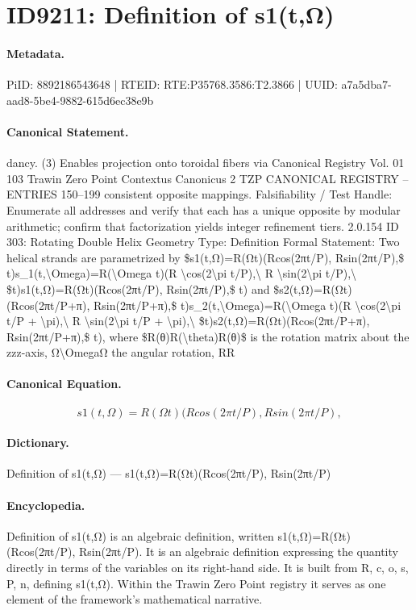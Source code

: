 \section*{ID9211: Definition of s1(t,Ω)}
\paragraph{Metadata.}
PiID: 8892186543648 | RTEID: RTE:P35768.3586:T2.3866 | UUID: a7a5dba7-aad8-5be4-9882-615d6ec38e9b

\paragraph{Canonical Statement.}
dancy. (3) Enables projection onto toroidal fibers via Canonical Registry Vol. 01 103 Trawin Zero Point Contextus Canonicus 2 TZP CANONICAL REGISTRY – ENTRIES 150–199 consistent opposite mappings. Falsifiability / Test Handle: Enumerate all addresses and verify that each has a unique opposite by modular arithmetic; confirm that factorization yields integer refinement tiers. 2.0.154 ID 303: Rotating Double Helix Geometry Type: Definition Formal Statement: Two helical strands are parametrized by \$s1(t,Ω)=R(Ωt)(Rcos(2πt/P), Rsin(2πt/P),\$ t)s\_1(t,\textbackslash{}Omega)=R(\textbackslash{}Omega t)(R \textbackslash{}cos(2\textbackslash{}pi t/P),\textbackslash{} R \textbackslash{}sin(2\textbackslash{}pi t/P),\textbackslash{} \$t)s1(t,Ω)=R(Ωt)(Rcos(2πt/P), Rsin(2πt/P),\$ t) and \$s2(t,Ω)=R(Ωt)(Rcos(2πt/P+π), Rsin(2πt/P+π),\$ t)s\_2(t,\textbackslash{}Omega)=R(\textbackslash{}Omega t)(R \textbackslash{}cos(2\textbackslash{}pi t/P + \textbackslash{}pi),\textbackslash{} R \textbackslash{}sin(2\textbackslash{}pi t/P + \textbackslash{}pi),\textbackslash{} \$t)s2(t,Ω)=R(Ωt)(Rcos(2πt/P+π), Rsin(2πt/P+π),\$ t), where \$R(θ)R(\textbackslash{}theta)R(θ)\$ is the rotation matrix about the zzz-axis, Ω\textbackslash{}OmegaΩ the angular rotation, RR

\paragraph{Canonical Equation.}
\[
s1(t,Ω)=R(Ωt)(Rcos(2πt/P), Rsin(2πt/P),
\]

\paragraph{Dictionary.}
Definition of s1(t,Ω) — s1(t,Ω)=R(Ωt)(Rcos(2πt/P), Rsin(2πt/P)

\paragraph{Encyclopedia.}
Definition of s1(t,Ω) is an algebraic definition, written s1(t,Ω)=R(Ωt)(Rcos(2πt/P), Rsin(2πt/P). It is an algebraic definition expressing the quantity directly in terms of the variables on its right-hand side. It is built from R, c, o, s, P, n, defining s1(t,Ω). Within the Trawin Zero Point registry it serves as one element of the framework's mathematical narrative.
